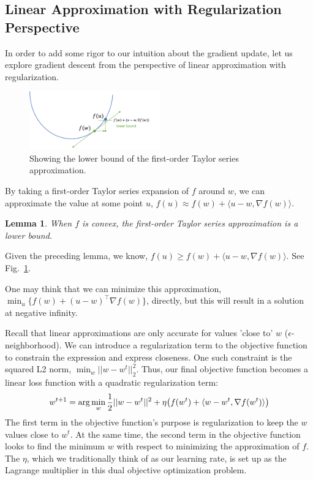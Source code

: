 \documentclass[11pt]{article}
\newtheorem{lemma}[theorem]{Lemma}
\begin{document}
\subsection{Linear Approximation with Regularization Perspective}
In order to add some rigor to our intuition about the gradient update, let us explore gradient descent from the perspective of linear approximation with regularization.
\begin{figure}[!h]
    \centering
    \includegraphics[width=0.5\textwidth]{regularized_gradient.png}
    \caption{Showing the lower bound of the first-order Taylor series approximation.}
    \label{fig:regularized}
\end{figure}
By taking a first-order Taylor series expansion of $f$ around $w$, we can approximate the value at some point $u$, $f(u) \approx f(w) + \langle u-w, \nabla f(w)\rangle$. 
\begin{lemma}
When $f$ is convex, the first-order Taylor series approximation is a lower bound.
\end{lemma}
Given the preceding lemma, we know, $f(u) \geq f(w) + \langle u-w, \nabla f(w)\rangle$. See Fig.~\ref{fig:regularized}.

One may think that we can minimize this approximation, $\min_u \{f(w) + (u-w)^\intercal \nabla f(w)\}$, directly, but this will result in a solution at negative infinity.

Recall that linear approximations are only accurate for values 'close to' $w$ ($\epsilon$-neighborhood). We can introduce a regularization term to the objective function to constrain the expression and express closeness. One such constraint is the squared L2 norm, $\min_w||w-w^t||^2_2$. Thus, our final objective function becomes a linear loss function with a quadratic regularization term:
$$w^{t+1} = \arg \min_w \frac{1}{2}||w-w^t||^2+\eta \big{(}f(w^t)+\langle w-w^t,\nabla f(w^t)\rangle\big{)}
$$
The first term in the objective function's purpose is regularization to keep the $w$ values close to $w^{t}$. At the same time, the second term in the objective function looks to find the minimum $w$ with respect to minimizing the approximation of $f$. The $\eta$, which we traditionally think of as our learning rate, is set up as the Lagrange multiplier in this dual objective optimization problem.
\end{document}
